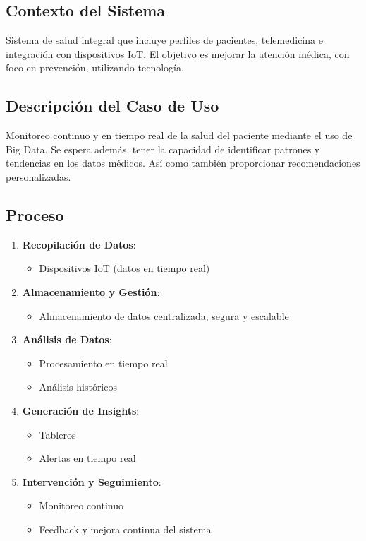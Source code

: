 \subsection{Contexto del Sistema}
Sistema de salud integral que incluye perfiles de pacientes, telemedicina e integración con dispositivos IoT. El objetivo es mejorar la atención médica, con foco en prevención, utilizando tecnología.

\subsection{Descripción del Caso de Uso}
Monitoreo continuo y en tiempo real de la salud del paciente mediante el uso de Big Data. Se espera además, tener la capacidad de identificar patrones y tendencias en los datos médicos. Así como también proporcionar recomendaciones personalizadas.

\subsection{Proceso}
\begin{enumerate}
    \item \textbf{Recopilación de Datos}:
    \begin{itemize}
        \item Dispositivos IoT (datos en tiempo real)
    \end{itemize}
    
    \item \textbf{Almacenamiento y Gestión}:
    \begin{itemize}
        \item Almacenamiento de datos centralizada, segura y escalable
    \end{itemize}
    
    \item \textbf{Análisis de Datos}:
    \begin{itemize}
        \item Procesamiento en tiempo real
        \item Análisis históricos
    \end{itemize}
    
    \item \textbf{Generación de Insights}:
    \begin{itemize}
        \item Tableros
        \item Alertas en tiempo real
    \end{itemize}
    
    \item \textbf{Intervención y Seguimiento}:
    \begin{itemize}
        \item Monitoreo continuo
        \item Feedback y mejora continua del sistema
    \end{itemize}
\end{enumerate}
